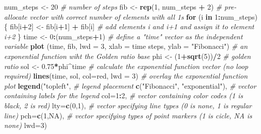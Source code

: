 \documentclass[
]{book}
\newenvironment{Shaded}{\begin{snugshade}}{\end{snugshade}}
\newcommand{\CommentTok}[1]{\textcolor[rgb]{0.56,0.35,0.01}{\textit{#1}}}
\newcommand{\ControlFlowTok}[1]{\textcolor[rgb]{0.13,0.29,0.53}{\textbf{#1}}}
\newcommand{\DataTypeTok}[1]{\textcolor[rgb]{0.13,0.29,0.53}{#1}}
\newcommand{\DecValTok}[1]{\textcolor[rgb]{0.00,0.00,0.81}{#1}}
\newcommand{\FloatTok}[1]{\textcolor[rgb]{0.00,0.00,0.81}{#1}}
\newcommand{\KeywordTok}[1]{\textcolor[rgb]{0.13,0.29,0.53}{\textbf{#1}}}
\newcommand{\NormalTok}[1]{#1}
\newcommand{\OperatorTok}[1]{\textcolor[rgb]{0.81,0.36,0.00}{\textbf{#1}}}
\newcommand{\OtherTok}[1]{\textcolor[rgb]{0.56,0.35,0.01}{#1}}
\newcommand{\StringTok}[1]{\textcolor[rgb]{0.31,0.60,0.02}{#1}}
\theoremstyle{definition}
\theoremstyle{definition}
\theoremstyle{definition}
\theoremstyle{remark}
\begin{document}
\begin{Shaded}
\begin{Highlighting}[]
\NormalTok{num\_steps \textless{}{-}}\StringTok{ }\DecValTok{20} \CommentTok{\# number of steps}
\NormalTok{fib \textless{}{-}}\StringTok{ }\KeywordTok{rep}\NormalTok{(}\DecValTok{1}\NormalTok{, num\_steps }\OperatorTok{+}\StringTok{ }\DecValTok{2}\NormalTok{) }\CommentTok{\# pre{-}allocate vector with correct number of elements with all 1s}
\ControlFlowTok{for}\NormalTok{ (i }\ControlFlowTok{in} \DecValTok{1}\OperatorTok{:}\NormalTok{num\_steps) \{}
\NormalTok{  fib[i}\OperatorTok{+}\DecValTok{2}\NormalTok{] \textless{}{-}}\StringTok{ }\NormalTok{fib[i}\OperatorTok{+}\DecValTok{1}\NormalTok{] }\OperatorTok{+}\StringTok{ }\NormalTok{fib[i] }\CommentTok{\# add elements i and i+1 and assign it to element i+2}
\NormalTok{\}}
\NormalTok{time \textless{}{-}}\StringTok{ }\DecValTok{0}\OperatorTok{:}\NormalTok{(num\_steps}\OperatorTok{+}\DecValTok{1}\NormalTok{) }\CommentTok{\# define a "time" vector as the independent variable}
\KeywordTok{plot}\NormalTok{ (time, fib, }\DataTypeTok{lwd =} \DecValTok{3}\NormalTok{, }\DataTypeTok{xlab =} \StringTok{\textquotesingle{}time steps\textquotesingle{}}\NormalTok{, }\DataTypeTok{ylab =} \StringTok{"Fibonacci"}\NormalTok{)}
\CommentTok{\# an exponential function wiht the Golden ratio base}
\NormalTok{phi \textless{}{-}}\StringTok{ }\NormalTok{(}\DecValTok{1}\OperatorTok{+}\KeywordTok{sqrt}\NormalTok{(}\DecValTok{5}\NormalTok{))}\OperatorTok{/}\DecValTok{2} \CommentTok{\# golden ratio}
\NormalTok{sol \textless{}{-}}\StringTok{ }\FloatTok{0.75}\OperatorTok{*}\NormalTok{phi}\OperatorTok{\^{}}\NormalTok{time }\CommentTok{\# calculate the exponential function vector (no loop required)}
\KeywordTok{lines}\NormalTok{(time, sol, }\DataTypeTok{col=}\StringTok{\textquotesingle{}red\textquotesingle{}}\NormalTok{, }\DataTypeTok{lwd =} \DecValTok{3}\NormalTok{) }\CommentTok{\# overlay the exponential function plot}
\KeywordTok{legend}\NormalTok{(}\StringTok{"topleft"}\NormalTok{, }\CommentTok{\# legend placement}
       \KeywordTok{c}\NormalTok{(}\StringTok{"Fibonacci"}\NormalTok{, }\StringTok{"exponential"}\NormalTok{), }\CommentTok{\# vector containing labels for the legend}
       \DataTypeTok{col=}\DecValTok{1}\OperatorTok{:}\DecValTok{2}\NormalTok{, }\CommentTok{\# vector containing color codes (1 is black, 2 is red)}
       \DataTypeTok{lty=}\KeywordTok{c}\NormalTok{(}\DecValTok{0}\NormalTok{,}\DecValTok{1}\NormalTok{), }\CommentTok{\# vector specifying line types (0 is none, 1 is regular line)}
       \DataTypeTok{pch=}\KeywordTok{c}\NormalTok{(}\DecValTok{1}\NormalTok{,}\OtherTok{NA}\NormalTok{), }\CommentTok{\# vector specifying types of point markers (1 is cicle, NA is none)}
       \DataTypeTok{lwd=}\DecValTok{3}\NormalTok{) }
\end{Highlighting}
\end{Shaded}
\end{document}
